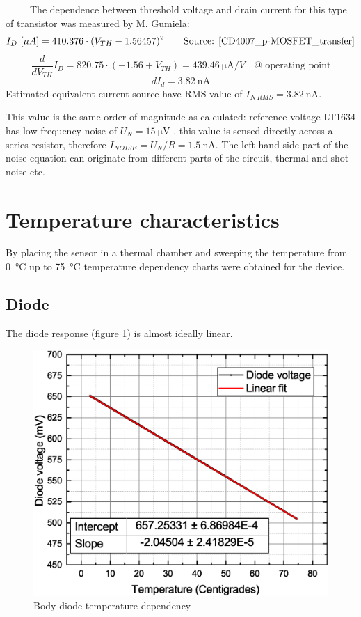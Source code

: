         The dependence between threshold voltage and drain current for this type of transistor was measured by M. Gumiela:
        $$I_D~[\mu A] = 410.376 \cdot (V_{TH} - 1.56457)^2 \text{~~~~~~Source: \ref{CD4007_p-MOSFET_transfer}}$$
        $$\frac{\textit{d}}{\textit{d}V_{TH}} I_D= 820.75 \cdot (-1.56 + V_{TH}) = \SI{439.46}{\uA/V} \text{~~~@ operating point}$$
        $$\textit{d}I_d = \SI{3.82}{\nA}$$
        Estimated equivalent current source have RMS value of $I_{N~RMS} = \SI{3.82}{\nA}$.

        This value is the same order of magnitude as calculated: reference voltage LT1634 has low-frequency noise of $U_N = \SI{15}{\uV}$ \cite{LT1634_datasheet}, this value is sensed directly across a series resistor, therefore $I_{NOISE} = U_N/R = \SI{1.5}{\nA}$. The left-hand side part of the noise equation can originate from different parts of the circuit, thermal and shot noise etc. %



\section{Temperature characteristics}
    By placing the sensor in a thermal chamber and sweeping the temperature from \SI{0}{\degreeCelsius} up to \SI{75}{\degreeCelsius} temperature dependency charts were obtained for the device.

    \subsection{Diode}
        The diode response (figure \ref{Body_diode_temperature_dependency}) is almost ideally linear.
        \begin{figure}[H]
            \centering
            \includegraphics[width=0.6\paperwidth]{img/07/diodeVsTemperature.eps}
            \caption{Body diode temperature dependency}
            \label{Body_diode_temperature_dependency}
        \end{figure}


